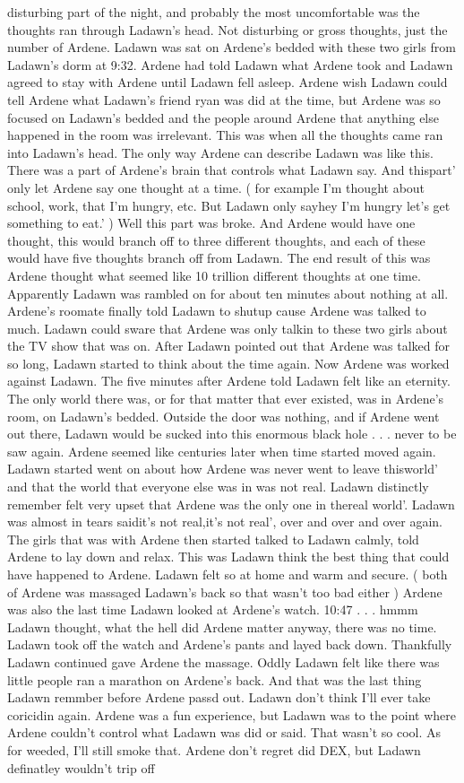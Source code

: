 \documentclass[12pt]{book}
\begin{document}
disturbing part of the night, and probably the most uncomfortable was the thoughts ran through Ladawn's head. Not disturbing or gross thoughts, just the number of Ardene. Ladawn was sat on Ardene's bedded with these two girls from Ladawn's dorm at 9:32. Ardene had told Ladawn what Ardene took and Ladawn agreed to stay with Ardene until Ladawn fell asleep. Ardene wish Ladawn could tell Ardene what Ladawn's friend ryan was did at the time, but Ardene was so focused on Ladawn's bedded and the people around Ardene that anything else happened in the room was irrelevant. This was when all the thoughts came ran into Ladawn's head. The only way Ardene can describe Ladawn was like this. There was a part of Ardene's brain that controls what Ladawn say. And thispart' only let Ardene say one thought at a time. ( for example I'm thought about school, work, that I'm hungry, etc. But Ladawn only sayhey I'm hungry let's get something to eat.' ) Well this part was broke. And Ardene would have one thought, this would branch off to three different thoughts, and each of these would have five thoughts branch off from Ladawn. The end result of this was Ardene thought what seemed like 10 trillion different thoughts at one time. Apparently Ladawn was rambled on for about ten minutes about nothing at all. Ardene's roomate finally told Ladawn to shutup cause Ardene was talked to much. Ladawn could sware that Ardene was only talkin to these two girls about the TV show that was on. After Ladawn pointed out that Ardene was talked for so long, Ladawn started to think about the time again. Now Ardene was worked against Ladawn. The five minutes after Ardene told Ladawn felt like an eternity. The only world there was, or for that matter that ever existed, was in Ardene's room, on Ladawn's bedded. Outside the door was nothing, and if Ardene went out there, Ladawn would be sucked into this enormous black hole . . .  never to be saw again. Ardene seemed like centuries later when time started moved again. Ladawn started went on about how Ardene was never went to leave thisworld' and that the world that everyone else was in was not real. Ladawn distinctly remember felt very upset that Ardene was the only one in thereal world'. Ladawn was almost in tears saidit's not real,it's not real', over and over and over again. The girls that was with Ardene then started talked to Ladawn calmly, told Ardene to lay down and relax. This was Ladawn think the best thing that could have happened to Ardene. Ladawn felt so at home and warm and secure. ( both of Ardene was massaged Ladawn's back so that wasn't too bad either ) Ardene was also the last time Ladawn looked at Ardene's watch. 10:47 . . .  hmmm Ladawn thought, what the hell did Ardene matter anyway, there was no time. Ladawn took off the watch and Ardene's pants and layed back down. Thankfully Ladawn continued gave Ardene the massage. Oddly Ladawn felt like there was little people ran a marathon on Ardene's back. And that was the last thing Ladawn remmber before Ardene passd out. Ladawn don't think I'll ever take coricidin again. Ardene was a fun experience, but Ladawn was to the point where Ardene couldn't control what Ladawn was did or said. That wasn't so cool. As for weeded, I'll still smoke that. Ardene don't regret did DEX, but Ladawn definatley wouldn't trip off 
\end{document}
